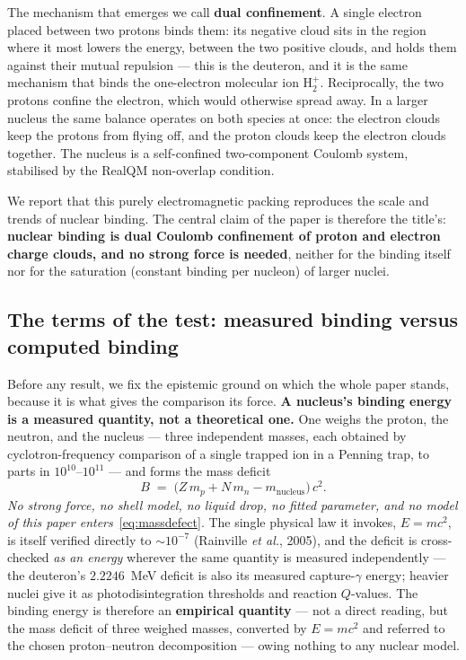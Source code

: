 \documentclass[11pt]{article}
\begin{document}
The mechanism that emerges we call \textbf{dual confinement}. A single electron placed between
two protons binds them: its negative cloud sits in the region where it most lowers the energy,
between the two positive clouds, and holds them against their mutual repulsion --- this is the
deuteron, and it is the same mechanism that binds the one-electron molecular ion
$\mathrm{H}_2^+$. Reciprocally, the two protons confine the electron, which would otherwise
spread away. In a larger nucleus the same balance operates on both species at once: the
electron clouds keep the protons from flying off, and the proton clouds keep the electron
clouds together. The nucleus is a self-confined two-component Coulomb system, stabilised by the
RealQM non-overlap condition.

We report that this purely electromagnetic packing reproduces the scale and trends of nuclear
binding. The central claim of the paper is therefore the title's: \textbf{nuclear binding is
dual Coulomb confinement of proton and electron charge clouds, and no strong force is needed},
neither for the binding itself nor for the saturation (constant binding per nucleon) of larger
nuclei.

\subsection{The terms of the test: measured binding versus computed binding}
\label{sec:measured-computed}

Before any result, we fix the epistemic ground on which the whole paper stands, because it
is what gives the comparison its force. \textbf{A nucleus's binding energy is a measured
quantity, not a theoretical one.} One weighs the proton, the neutron, and the nucleus --- three
independent masses, each obtained by cyclotron-frequency comparison of a single trapped ion in a
Penning trap, to parts in $10^{10}$--$10^{11}$ --- and forms the mass deficit
\begin{equation}
B \;=\; \bigl(Z\,m_p + N\,m_n - m_{\text{nucleus}}\bigr)\,c^2 .
\label{eq:massdefect}
\end{equation}
\emph{No strong force, no shell model, no liquid drop, no fitted parameter, and no model of this
paper enters}~\eqref{eq:massdefect}. The single physical law it invokes, $E=mc^2$, is itself
verified directly to $\sim\!10^{-7}$ (Rainville \emph{et al.}, 2005), and the deficit is
cross-checked \emph{as an energy} wherever the same quantity is measured independently --- the
deuteron's $2.2246$~MeV deficit is also its measured capture-$\gamma$ energy; heavier nuclei give
it as photodisintegration thresholds and reaction $Q$-values. The binding energy is therefore an
\textbf{empirical quantity} --- not a direct reading, but the mass deficit of three weighed masses,
converted by $E=mc^2$ and referred to the chosen proton--neutron decomposition --- owing nothing to
any nuclear model.
\end{document}

